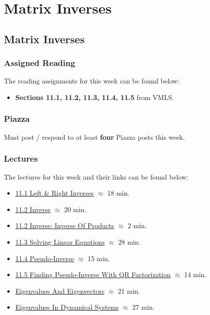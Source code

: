 \clearpage

\renewcommand{\ChapTitle}{Matrix Inverses}
\renewcommand{\SectionTitle}{Matrix Inverses}

\chapter{\ChapTitle}
\section{\SectionTitle}

\subsection{Assigned Reading}

The reading assignments for this week can be found below:

\begin{itemize}
    \item \textbf{Sections 11.1, 11.2, 11.3, 11.4, 11.5} from VMLS.
\end{itemize}

\subsection{Piazza}

Must post / respond to at least \textbf{four} Piazza posts this week.  

\subsection{Lectures}

The lectures for this week and their links can be found below:

\begin{itemize}
    \item \href{https://applied.cs.colorado.edu/mod/hvp/view.php?id=50802}{11.1 Left \& Right Inverses} $\approx$ 18 min.
    \item \href{https://applied.cs.colorado.edu/mod/hvp/view.php?id=50803}{11.2 Inverse} $\approx$ 20 min.
    \item \href{https://applied.cs.colorado.edu/mod/hvp/view.php?id=50804}{11.2 Inverse: Inverse Of Products} $\approx$ 2 min.
    \item \href{https://applied.cs.colorado.edu/mod/hvp/view.php?id=50805}{11.3 Solving Linear Equations} $\approx$ 28 min.
    \item \href{https://applied.cs.colorado.edu/mod/hvp/view.php?id=50806}{11.4 Pseudo-Inverse} $\approx$ 15 min.
    \item \href{https://applied.cs.colorado.edu/mod/hvp/view.php?id=50807}{11.5 Finding Pseudo-Inverse With QR Factorization} $\approx$ 14 min.
    \item \href{https://applied.cs.colorado.edu/mod/hvp/view.php?id=50808}{Eigenvalues And Eigenvectors} $\approx$ 21 min.
    \item \href{https://applied.cs.colorado.edu/mod/hvp/view.php?id=50809}{Eigenvalues In Dynamical Systems} $\approx$ 27 min.
\end{itemize}

